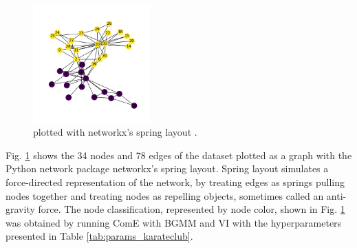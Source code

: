 \documentclass[conference]{IEEEtran}
\begin{document}
\begin{figure}[htbp]
    \centering
    \includegraphics[width=0.4\textwidth]{images/karateclub/spring.png}
    \caption{\citet{KarateClubDS} plotted with networkx's spring layout \cite{KarateClubDS, networkx}.}
    \label{fig:karateclub_spring}
\end{figure}

Fig. \ref{fig:karateclub_spring} shows the 34 nodes and 78 edges of the \citet{KarateClubDS} dataset plotted as a graph with the Python network package networkx's spring layout.\cite{networkx} Spring layout simulates a force-directed representation of the network, by treating edges as springs pulling nodes together and treating nodes as repelling objects, sometimes called an anti-gravity force.\cite{networkx} The node classification, represented by node color, shown in Fig. \ref{fig:karateclub_spring} was obtained by running ComE with BGMM and VI with the hyperparameters presented in Table \ref{tab:params_karateclub}.
\end{document}
